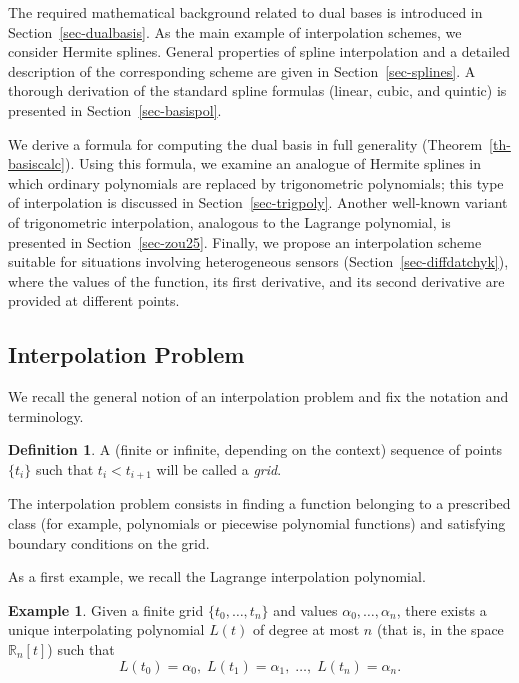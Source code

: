 \documentclass{article}
\theoremstyle{definition}
\newtheorem{example}[theorem]{Example}
\theoremstyle{definition}
\newtheorem{definition}{Definition}
\numberwithin{figure}{section}
\newcommand{\1}{\mathbf{1}}
\begin{document}
The required mathematical background related to dual bases is introduced in Section~\ref{sec-dualbasis}. As the main example of interpolation schemes, we consider Hermite splines. General properties of spline interpolation and a detailed description of the corresponding scheme are given in Section~\ref{sec-splines}. A thorough derivation of the standard spline formulas (linear, cubic, and quintic) is presented in Section~\ref{sec-basispol}.

We derive a formula for computing the dual basis in full generality (Theorem~\ref{th-basiscalc}). Using this formula, we examine an analogue of Hermite splines in which ordinary polynomials are replaced by trigonometric polynomials; this type of interpolation is discussed in Section~\ref{sec-trigpoly}. Another well-known variant of trigonometric interpolation, analogous to the Lagrange polynomial, is presented in Section~\ref{sec-zou25}. Finally, we propose an interpolation scheme suitable for situations involving heterogeneous sensors (Section~\ref{sec-diffdatchyk}), where the values of the function, its first derivative, and its second derivative are provided at different points.

\subsection{Interpolation Problem}

We recall the general notion of an interpolation problem and fix the notation and terminology.

\begin{definition}
A (finite or infinite, depending on the context) sequence of points $\{t_i\}$ such that $t_i < t_{i+1}$ will be called a \emph{grid}.
\end{definition}

The interpolation problem consists in finding a function belonging to a prescribed class (for example, polynomials or piecewise polynomial functions) and satisfying boundary conditions on the grid.

As a first example, we recall the Lagrange interpolation polynomial.

\begin{example}\label{ex-Lagr}
Given a finite grid $\{t_0, \ldots, t_n\}$ and values $\alpha_0, \ldots, \alpha_n$, there exists a unique interpolating polynomial $L(t)$ of degree at most $n$ (that is, in the space $\mathbb{R}_n[t]$) such that
\[
    L(t_0) = \alpha_0,\; L(t_1) = \alpha_1,\; \ldots,\; L(t_n) = \alpha_n.
\]
\end{example}
\end{document}
